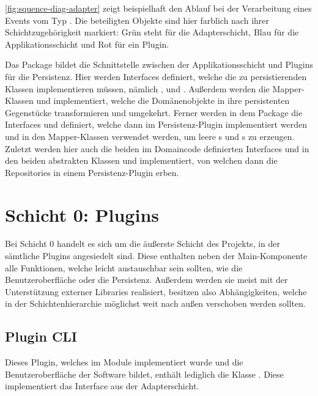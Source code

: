 \autoref{fig:squence-diag-adapter} zeigt beispielhaft den Ablauf bei der Verarbeitung eines Events vom Typ . Die beteiligten Objekte sind hier farblich nach ihrer Schichtzugehörigkeit markiert: Grün steht für die Adapterschicht, Blau für die Applikationsschicht und Rot für ein Plugin.

Das Package \href{https://github.com/anditru/quickie/tree/bb41442c7f1ffbfcd3117cd86a40f7932e543a33/1-quickie-adapters/src/main/java/org/pinkcrazyunicorn/quickie/adapters/persistence}{} bildet die Schnittstelle zwischen der Applikationsschicht und Plugins für die Persistenz. Hier werden Interfaces definiert, welche die zu persistierenden Klassen implementieren müssen, nämlich ,  und . Außerdem werden die Mapper-Klassen  und  implementiert, welche die Domänenobjekte in ihre persistenten Gegenstücke transformieren und umgekehrt. Ferner werden in dem Package die Interfaces  und  definiert, welche dann im Persistenz-Plugin implementiert werden und in den Mapper-Klassen verwendet werden, um leere s und s zu erzeugen. Zuletzt werden hier auch die beiden im Domaincode definierten Interfaces  und  in den beiden abstrakten Klassen  und  implementiert, von welchen dann die Repositories in einem Persistenz-Plugin erben.

\section{Schicht 0: Plugins}
Bei Schicht 0 handelt es sich um die äußerste Schicht des Projekts, in der sämtliche Plugins angesiedelt sind. Diese enthalten neben der Main-Komponente alle Funktionen, welche leicht austauschbar sein sollten, wie die Benutzeroberfläche oder die Persistenz. Außerdem werden sie meist mit der Unterstützung externer Libraries realisiert, besitzen also Abhängigkeiten, welche in der Schichtenhierarchie möglichst weit nach außen verschoben werden sollten.

\subsection{Plugin \acs{CLI}}
Dieses Plugin, welches im Module \href{https://github.com/anditru/quickie/tree/bb41442c7f1ffbfcd3117cd86a40f7932e543a33/0-quickie-plugin-cli}{} implementiert wurde und die Benutzeroberfläche der Software bildet, enthält lediglich die Klasse . Diese implementiert das Interface  aus der Adapterschicht.


